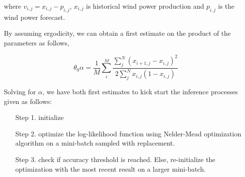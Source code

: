 \documentclass[10pt,twocolumn,letterpaper]{article}
\begin{document}
 where $v_{i,j}=x_{i,j}-p_{i,j}$,  $x_{i,j}$ is historical wind power production and $p_{i,j}$ is the wind power forecast.
 
 By assuming ergodicity, we can obtain a first estimate on the product of the parameters as follows,
 
\begin{equation}
\theta_0 \alpha = \frac{1}{M} \sum\limits_i^M \frac{ \sum\limits_j^N (x_{i+1,j}  - x_{i,j})^2}{2 \sum\limits_j^N x_{i,j}(1-x_{i,j}) }
\end{equation}

Solving for $\alpha$, we have both first estimates to kick start the inference processes given as follows:
\begin{enumerate}
\item[Step 1.]  initialize
\item[Step 2.]  optimize the log-likelihood function using  Nelder-Mead optimization algorithm on a mini-batch sampled with replacement.
\item[Step 3. ] check if  accuracy threshold is reached. Else, re-initialize the optimization with the most recent result on a larger mini-batch.
\end{enumerate}
\end{document}
